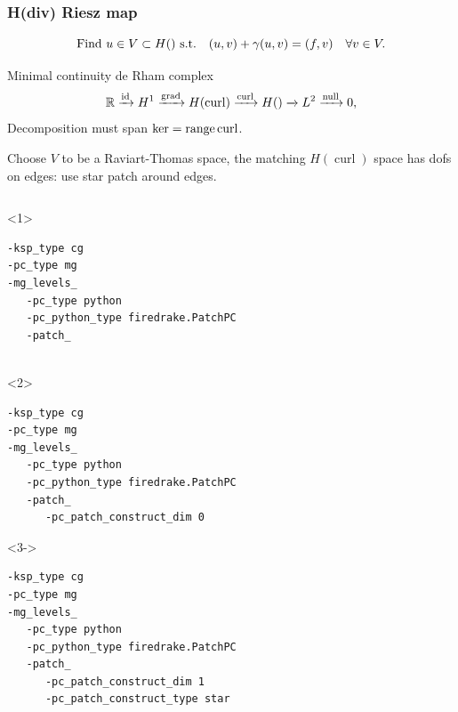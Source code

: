 \documentclass[presentation,aspectratio=43,10pt]{beamer}
\DeclareMathOperator{\grad}{grad}
\let\div\relax
\DeclareMathOperator{\div}{div}
\DeclareMathOperator{\curl}{curl}
\DeclareMathOperator{\range}{range}
\begin{document}
\begin{frame}[fragile]
  \frametitle{H(div) Riesz map}
  \vspace{-1.5\baselineskip}
  \begin{equation*}
    \text{Find $u \in V \subset H(\div)$ s.t.}\quad (u, v) + \gamma (\div u, \div v) = (f, v) \quad \forall v \in V.
  \end{equation*}
  \vspace*{-\baselineskip}
  \begin{block}{Minimal continuity de Rham complex}
    \begin{equation*}
      \mathbb{R} \xrightarrow{\operatorname{id}} H^1 \xrightarrow{\grad} H(\curl)
      \xrightarrow{\curl} H(\div) \xrightarrow{\div} L^2 \xrightarrow{\operatorname{null}} 0,
    \end{equation*}
    Decomposition must span $\ker \div = \range \curl$.

    Choose $V$ to be a Raviart-Thomas space, the matching $H(\curl)$
    space has dofs on edges: use star patch around edges.
  \end{block}
  \begin{columns}
    \begin{column}{0.6\textwidth}
      \begin{onlyenv}<1>
\begin{verbatim}
-ksp_type cg
-pc_type mg
-mg_levels_
   -pc_type python
   -pc_python_type firedrake.PatchPC
   -patch_


\end{verbatim}
      \end{onlyenv}
      \begin{onlyenv}<2>
\begin{verbatim}
-ksp_type cg
-pc_type mg
-mg_levels_
   -pc_type python
   -pc_python_type firedrake.PatchPC
   -patch_
      -pc_patch_construct_dim 0

\end{verbatim}
      \end{onlyenv}
      \begin{onlyenv}<3->
\begin{verbatim}
-ksp_type cg
-pc_type mg
-mg_levels_
   -pc_type python
   -pc_python_type firedrake.PatchPC
   -patch_
      -pc_patch_construct_dim 1
      -pc_patch_construct_type star
\end{verbatim}
      \end{onlyenv}
    \end{column}
    \begin{column}{0.4\textwidth}
      \begin{center}
\end{center}
\end{column}
\end{columns}
\end{frame}
\end{document}
